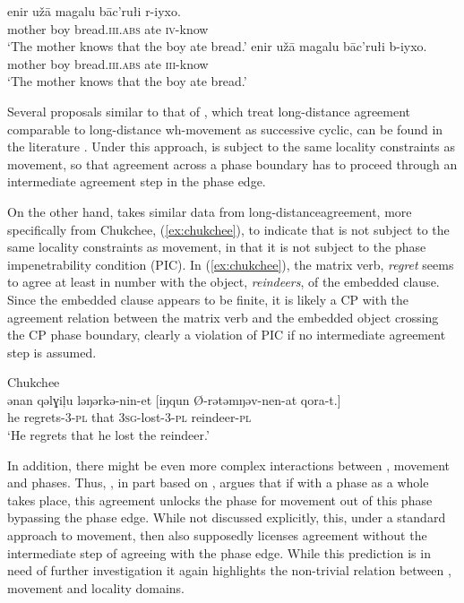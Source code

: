 \documentclass[output=paper
,modfonts
,nonflat]{langsci/langscibook}
\begin{document}
\begin{exe}
	\ex
	\begin{xlist}
		\ex
		\gll enir u\v{z}ā magalu bāc'rułi r-iyxo.\\
		mother boy bread.\textsc{iii.abs} ate \textsc{iv}-know\\
		\glt `The mother knows that the boy ate bread.'
		\ex
		\gll enir u\v{z}ā magalu bāc'rułi b-iyxo.\\
		mother boy bread.\textsc{iii.abs} ate \textsc{iii}-know\\
		\glt `The mother knows that the boy ate bread.'
	\end{xlist}
\end{exe}
Several proposals similar to that of \cite{polinskypotsdam2001}, which treat long-distance agreement comparable to long-distance wh-movement as successive cyclic, can be found in the literature \citep{Legate2005,Frank2006,bjorkmanzeijlstra}.
Under this approach, \agr{} is subject to the same locality constraints as movement, so that agreement across a phase boundary has to proceed through an intermediate agreement step in the phase edge.

On the other hand, \citet{Boskovic2007} takes similar data from long-distance\linebreak agreement, more specifically from Chukchee, (\ref{ex:chukchee}), to indicate that \agr{} is not subject to the same locality constraints as movement, in that it is not subject to the phase impenetrability condition (PIC). In (\ref{ex:chukchee}), the matrix verb, \textit{regret} seems to agree at least in number with the object, \textit{reindeers}, of the embedded clause. Since the embedded clause appears to be finite, it is likely a CP with the agreement relation between the matrix verb and the embedded object crossing the CP phase boundary, clearly a violation of PIC if no intermediate agreement step is assumed.

\begin{exe}
	\ex Chukchee \citep{Boskovic2007}\\
	\gll ənan {qəlɣiļu ləŋərkə-nin-et} [iŋqun Ø-rətəmŋəv-nen-at qora-t.]\\
	he regrets-3-\textsc{pl} that \textsc{3sg}-lost-3-\textsc{pl} reindeer-\textsc{pl}\\
	\glt `He regrets that he lost the reindeer.' \label{ex:chukchee} 
\end{exe}
In addition, there might be even more complex interactions between \agr, movement and phases. Thus, \citet{branan2018}, in part based on \citet{rackowskirichards2005}, argues that if \agr{} with a phase as a whole takes place, this agreement unlocks the phase for movement out of this phase bypassing the phase edge.
While not discussed explicitly, this, under a standard approach to movement, then also supposedly licenses agreement without the intermediate step of agreeing with the phase edge. While this prediction is in need of further investigation it again highlights the non-trivial relation between \agr, movement and locality domains.
\end{document}
